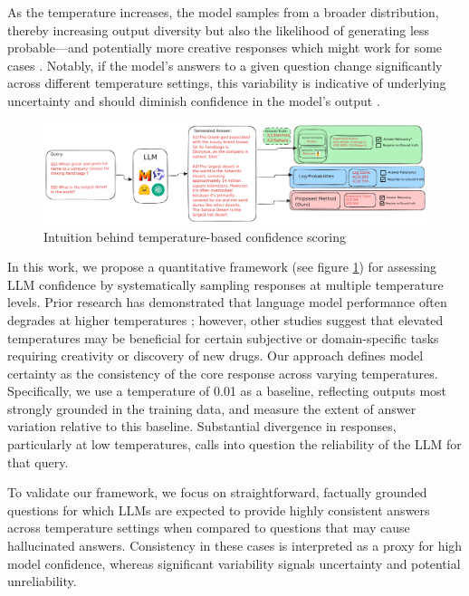 \documentclass[sigconf]{acmart}
\begin{document}
As the temperature increases, the model samples from a broader distribution, thereby increasing output diversity but also the likelihood of generating less probable—and potentially more creative responses which might work for some cases \cite{hallucinations_drug,temperature_effect}. Notably, if the model's answers to a given question change significantly across different temperature settings, this variability is indicative of underlying uncertainty and should diminish confidence in the model's output \cite{detecting_hallucinations}.

\begin{figure}[t]
    \centering
    \includegraphics[width=\textwidth]{images/Figure_teaser.pdf}
    \caption{Intuition behind temperature-based confidence scoring}
    \label{fig:intuition}
\end{figure}


In this work, we propose a quantitative framework (see figure \ref{fig:intuition}) for assessing LLM confidence by systematically sampling responses at multiple temperature levels. Prior research has demonstrated that language model performance often degrades at higher temperatures \cite{confidence_under_hood,log_probs_reliability}; however, other studies suggest that elevated temperatures may be beneficial for certain subjective or domain-specific tasks \cite{hallucinations_drug,temperature_effect,detecting_hallucinations,monte_carlo_temperature} requiring creativity or discovery of new drugs. Our approach defines model certainty as the consistency of the core response across varying temperatures. Specifically, we use a temperature of 0.01 as a baseline, reflecting outputs most strongly grounded in the training data, and measure the extent of answer variation relative to this baseline. Substantial divergence in responses, particularly at low temperatures, calls into question the reliability of the LLM for that query.

To validate our framework, we focus on straightforward, factually grounded questions for which LLMs are expected to provide highly consistent answers across temperature settings when compared to questions that may cause hallucinated answers.
Consistency in these cases is interpreted as a proxy for high model confidence, whereas significant variability signals uncertainty and potential unreliability.
\end{document}

